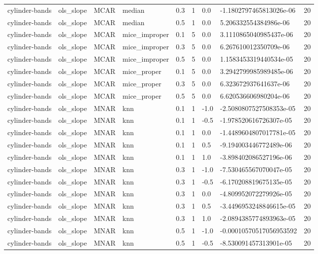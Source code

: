 \begin{tabular}{lllllllll}
cylinder-bands & ols\_slope & MCAR & median & 0.3 & 1 & 0.0 & -1.1802797465813026e-06 & 20 \\
cylinder-bands & ols\_slope & MCAR & median & 0.5 & 1 & 0.0 & 5.206332554384986e-06 & 20 \\
cylinder-bands & ols\_slope & MCAR & mice\_improper & 0.1 & 5 & 0.0 & 3.1110865040985437e-06 & 20 \\
cylinder-bands & ols\_slope & MCAR & mice\_improper & 0.3 & 5 & 0.0 & 6.267610012350709e-06 & 20 \\
cylinder-bands & ols\_slope & MCAR & mice\_improper & 0.5 & 5 & 0.0 & 1.1583453319440534e-05 & 20 \\
cylinder-bands & ols\_slope & MCAR & mice\_proper & 0.1 & 5 & 0.0 & 3.2942799985989485e-06 & 20 \\
cylinder-bands & ols\_slope & MCAR & mice\_proper & 0.3 & 5 & 0.0 & 6.323672937641637e-06 & 20 \\
cylinder-bands & ols\_slope & MCAR & mice\_proper & 0.5 & 5 & 0.0 & 6.620536606980204e-06 & 20 \\
cylinder-bands & ols\_slope & MNAR & knn & 0.1 & 1 & -1.0 & -2.5080807527508353e-05 & 20 \\
cylinder-bands & ols\_slope & MNAR & knn & 0.1 & 1 & -0.5 & -1.978520616726307e-05 & 20 \\
cylinder-bands & ols\_slope & MNAR & knn & 0.1 & 1 & 0.0 & -1.4489604807017781e-05 & 20 \\
cylinder-bands & ols\_slope & MNAR & knn & 0.1 & 1 & 0.5 & -9.194003446772489e-06 & 20 \\
cylinder-bands & ols\_slope & MNAR & knn & 0.1 & 1 & 1.0 & -3.898402086527196e-06 & 20 \\
cylinder-bands & ols\_slope & MNAR & knn & 0.3 & 1 & -1.0 & -7.530465567070047e-05 & 20 \\
cylinder-bands & ols\_slope & MNAR & knn & 0.3 & 1 & -0.5 & -6.170208819675135e-05 & 20 \\
cylinder-bands & ols\_slope & MNAR & knn & 0.3 & 1 & 0.0 & -4.809952072279926e-05 & 20 \\
cylinder-bands & ols\_slope & MNAR & knn & 0.3 & 1 & 0.5 & -3.4496953248846615e-05 & 20 \\
cylinder-bands & ols\_slope & MNAR & knn & 0.3 & 1 & 1.0 & -2.0894385774893963e-05 & 20 \\
cylinder-bands & ols\_slope & MNAR & knn & 0.5 & 1 & -1.0 & -0.00010570517056953592 & 20 \\
cylinder-bands & ols\_slope & MNAR & knn & 0.5 & 1 & -0.5 & -8.530091457313901e-05 & 20 \\

\end{tabular}
